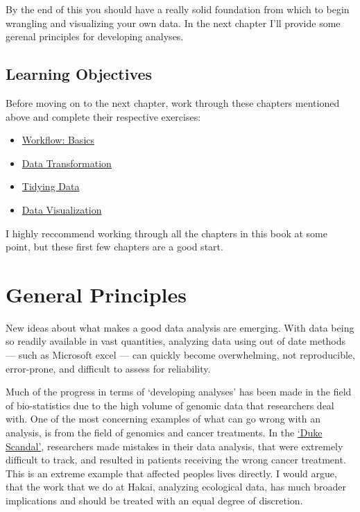 \documentclass[]{book}
\providecommand{\tightlist}{%
  \setlength{\itemsep}{0pt}\setlength{\parskip}{0pt}}
\begin{document}
By the end of this you should have a really solid foundation from which
to begin wrangling and visualizing your own data. In the next chapter
I'll provide some gerenal principles for developing analyses.

\section{Learning Objectives}\label{learning-objectives}

Before moving on to the next chapter, work through these chapters
mentioned above and complete their respective exercises:

\begin{itemize}
\tightlist
\item
  \href{http://r4ds.had.co.nz/workflow-basics.html}{Workflow: Basics}
\item
  \href{http://r4ds.had.co.nz/transform.html}{Data Transformation}
\item
  \href{http://r4ds.had.co.nz/tidy-data.html}{Tidying Data}
\item
  \href{http://r4ds.had.co.nz/data-visualisation.html\#facets}{Data
  Visualization}
\end{itemize}

I highly reccommend working through all the chapters in this book at
some point, but these first few chapters are a good start.

\chapter{General Principles}\label{general-principles}

New ideas about what makes a good data analysis are emerging. With data
being so readily available in vast quantities, analyzing data using out
of date methods --- such as Microsoft excel --- can quickly become
overwhelming, not reproducible, error-prone, and difficult to assess for
reliability.

Much of the progress in terms of `developing analyses' has been made in
the field of bio-statistics due to the high volume of genomic data that
researchers deal with. One of the most concerning examples of what can
go wrong with an analysis, is from the field of genomics and cancer
treatments. In the
\href{http://www.cbsnews.com/news/deception-at-duke-fraud-in-cancer-care/}{`Duke
Scandal'}, researchers made mistakes in their data analysis, that were
extremely difficult to track, and resulted in patients receiving the
wrong cancer treatment. This is an extreme example that affected peoples
lives directly. I would argue, that the work that we do at Hakai,
analyzing ecological data, has much broader implications and should be
treated with an equal degree of discretion.
\end{document}
